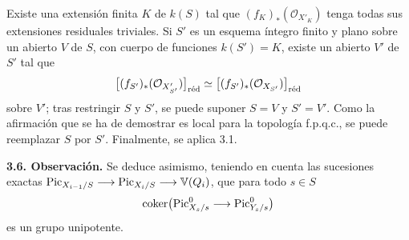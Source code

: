 Existe una extensión finita $K$ de $k(S)$ tal que
$(f_K)_*(\mathcal O_{X'_K})$ tenga todas sus extensiones residuales
triviales. Si $S'$ es un esquema íntegro finito y plano sobre un abierto
$V$ de $S$, con cuerpo de funciones $k(S')=K$, existe un abierto $V'$ de
$S'$ tal que
\[
\bigl[(f_{S'})_*(\mathcal O_{X'_{S'}})\bigr]_{\red}
\simeq
\bigl[(f_{S'})_*(\mathcal O_{X_{S'}})\bigr]_{\red}
\]
sobre $V'$; tras restringir $S$ y $S'$, se puede suponer $S=V$ y $S'=V'$.
Como la afirmación que se ha de demostrar es local para la topología
f.p.q.c., se puede reemplazar $S$ por $S'$. Finalmente, se aplica 3.1.

\textbf{3.6. Observación.} Se deduce asimismo, teniendo en cuenta las
sucesiones exactas
$\Pic_{X_{i-1}/S}\longrightarrow\Pic_{X_i/S}\longrightarrow\mathbb V(Q_i)$,
que para todo $s\in S$
\[
\coker\bigl(\Pic^0_{X_s/s}\longrightarrow\Pic^0_{Y_s/s}\bigr)
\]
es un grupo unipotente.
